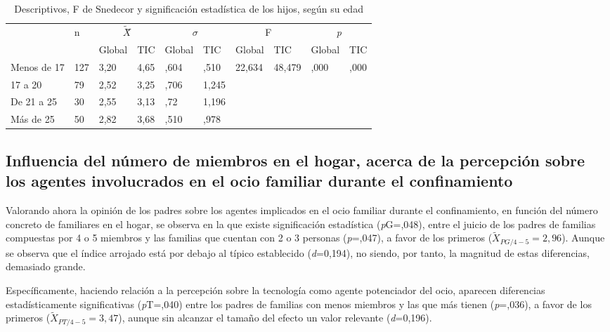 \documentclass{textolivre}
\begin{document}
\begin{table}[htpb]
\caption{Descriptivos, F de Snedecor y significación estadística de los hijos, según su edad}
\label{tab4}
\centering
\begin{tabular}{llllllllll}
\toprule
& \multirow{2}{*}{n} & \multicolumn{2}{c}{$\tilde{X}$̃} & \multicolumn{2}{c}{\begin{math}\sigma\end{math}} & \multicolumn{2}{c}{F} & \multicolumn{2}{c}{\emph{p}}
\\
& & Global & TIC & Global & TIC & Global & TIC & Global & TIC
\\
\midrule
Menos de 17 & 127 & 3,20 & 4,65 & ,604 & ,510 & 22,634 & 48,479 & ,000 & ,000
\\
17 a 20 & 79 & 2,52 & 3,25 & ,706 & 1,245 & & & &	 	 	 
\\
De 21 a 25  & 30 & 2,55 & 3,13 & ,72 & 1,196	 	 	 	 
\\
Más de 25 & 50 & 2,82 & 3,68 & ,510 & ,978	 	 	 	 
\\
\bottomrule
\end{tabular}
\centering
{}
\end{table}

\subsection{Influencia del número de miembros en el hogar, acerca de la percepción sobre los agentes involucrados en el ocio familiar durante el confinamiento}
Valorando ahora la opinión de los padres sobre los agentes implicados en el ocio familiar durante el confinamiento, en función del número concreto de familiares en el hogar, se observa en la  que existe significación estadística (\emph{p}G=,048), entre el juicio de los padres de familias compuestas por 4 o 5 miembros y las familias que cuentan con 2 o 3 personas (\emph{p}=,047), a favor de los primeros ($\tilde{X}_{PG/4-5}=2,96$). Aunque se observa que el índice arrojado está por debajo al típico establecido (\emph{d}=0,194), no siendo, por tanto, la magnitud de estas diferencias, demasiado grande.

Específicamente, haciendo relación a la percepción sobre la tecnología como agente potenciador del ocio, aparecen diferencias estadísticamente significativas (\emph{p}T=,040) entre los padres de familias con menos miembros y las que más tienen (\emph{p}=,036), a favor de los primeros ($\tilde{X}_{PT/4-5}=3,47$), aunque sin alcanzar el tamaño del efecto un valor relevante (\emph{d}=0,196).
\end{document}
